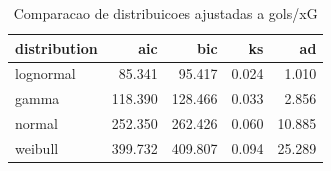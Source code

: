 \begin{table}

\caption{\label{tab:ajuste_dist_g10}Comparacao de distribuicoes ajustadas a gols/xG}
\centering
\begin{tabular}[t]{lrrrr}
\toprule
distribution & aic & bic & ks & ad\\
\midrule
lognormal & 85.341 & 95.417 & 0.024 & 1.010\\
gamma & 118.390 & 128.466 & 0.033 & 2.856\\
normal & 252.350 & 262.426 & 0.060 & 10.885\\
weibull & 399.732 & 409.807 & 0.094 & 25.289\\
\bottomrule
\end{tabular}
\end{table}
